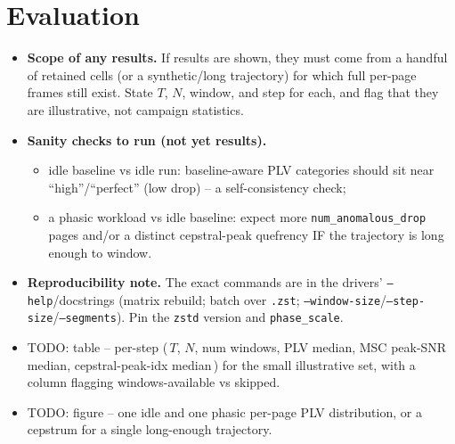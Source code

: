 \documentclass[conference]{IEEEtran}
\begin{document}
\section{Evaluation}
\label{sec:results}
\begin{itemize}
  \item \textbf{Scope of any results.} If results are shown, they must come from
        a handful of retained cells (or a synthetic/long trajectory) for which
        full per-page frames still exist. State $T$, $N$, window, and step for
        each, and flag that they are illustrative, not campaign statistics.
  \item \textbf{Sanity checks to run (not yet results).}
    \begin{itemize}
      \item idle baseline vs idle run: baseline-aware PLV categories should sit
            near ``high''/``perfect'' (low drop) -- a self-consistency check;
      \item a phasic workload vs idle baseline: expect more
            \texttt{num\_anomalous\_drop} pages and/or a distinct cepstral-peak
            quefrency IF the trajectory is long enough to window.
    \end{itemize}
  \item \textbf{Reproducibility note.} The exact commands are in the drivers'
        \texttt{--help}/docstrings (matrix rebuild; batch over \texttt{.zst};
        \texttt{--window-size}/\texttt{--step-size}/\texttt{--segments}). Pin
        the \texttt{zstd} version and \texttt{phase\_scale}.
  \item TODO: table -- per-step (\,$T$, $N$, num windows, PLV median, MSC
        peak-SNR median, cepstral-peak-idx median\,) for the small illustrative
        set, with a column flagging windows-available vs skipped.
  \item TODO: figure -- one idle and one phasic per-page PLV distribution, or a
        cepstrum for a single long-enough trajectory.
\end{itemize}
\end{document}
